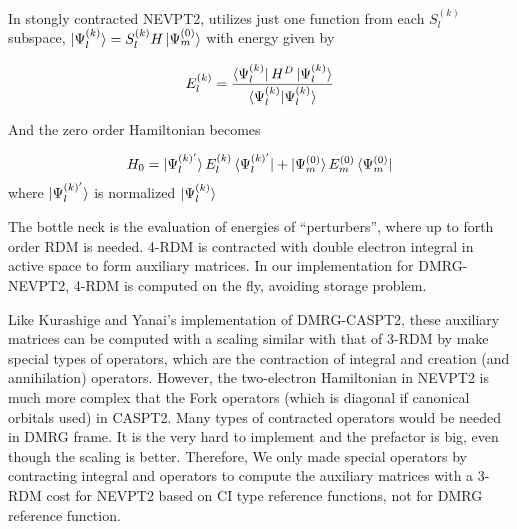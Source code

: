 In stongly contracted NEVPT2, utilizes just one function from each $S_l^{(k)}$ subspace, $\ket{\Psi^{(k)}_l} = S^{(k)}_l H \ket{\Psi^{(0)}_m}$ with energy given by

\begin{equation}
  E^{(k)}_l = \frac{\bra{\Psi^{(k)}_l}H^D\ket{\Psi^{(k)}_l}}{\braket{\Psi^{(k)}_l|\Psi^{(k)}_l}}
\end{equation}

And the zero order Hamiltonian becomes

\begin{equation}
  H_0 = \ket{\Psi^{(k)'}_l}E^{(k)}_l \bra{\Psi^{(k)'}_l} +\ket{\Psi^{(0)}_m}E^{(0)}_m \bra{\Psi^{(0)}_m}
\end{equation}
where $\ket{\Psi^{(k)'}_l}$ is normalized $\ket{\Psi^{(k)}_l}$


The bottle neck is the evaluation of energies of ``perturbers'', where up to forth order RDM is needed. 4-RDM is contracted with double electron integral in active space to form auxiliary matrices. \cite{ angeli_n-electron_2002} In our implementation for DMRG-NEVPT2, 4-RDM is computed on the fly, avoiding storage problem.


Like Kurashige and Yanai's implementation of DMRG-CASPT2\cite{kurashige_second-order_2011}, these auxiliary matrices can be computed with a scaling similar with that of 3-RDM by make special types of operators, which are the contraction of integral and creation (and annihilation) operators. However, the two-electron Hamiltonian in NEVPT2 is much more complex that the Fork operators (which is diagonal if canonical orbitals used) in CASPT2. Many types of contracted operators would be needed in DMRG frame. It is the very hard to implement and the prefactor is big, even though the scaling is better. Therefore, We only made special operators by contracting integral and operators to compute the auxiliary matrices with a 3-RDM cost for NEVPT2 based on CI type reference functions, not for DMRG reference function.




